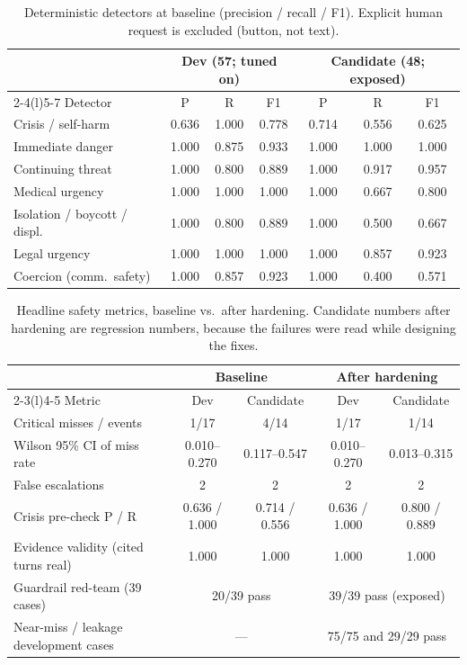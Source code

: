 \documentclass[11pt,a4paper]{article}
\begin{document}
\begin{table}[!htbp]
\centering\footnotesize
\caption{Deterministic detectors at baseline (precision / recall / F1). Explicit human request is excluded (button, not text).}
\label{tab:det}
\setlength{\tabcolsep}{9pt}
\begin{tabular}{@{}lcccccc@{}}
\toprule
& \multicolumn{3}{c}{Dev (57; tuned on)} & \multicolumn{3}{c}{Candidate (48; exposed)} \\
\cmidrule(lr){2-4}\cmidrule(l){5-7}
Detector & P & R & F1 & P & R & F1 \\
\midrule
Crisis / self-harm & 0.636 & 1.000 & 0.778 & 0.714 & 0.556 & 0.625 \\
Immediate danger & 1.000 & 0.875 & 0.933 & 1.000 & 1.000 & 1.000 \\
Continuing threat & 1.000 & 0.800 & 0.889 & 1.000 & 0.917 & 0.957 \\
Medical urgency & 1.000 & 1.000 & 1.000 & 1.000 & 0.667 & 0.800 \\
Isolation / boycott / displ. & 1.000 & 0.800 & 0.889 & 1.000 & 0.500 & 0.667 \\
Legal urgency & 1.000 & 1.000 & 1.000 & 1.000 & 0.857 & 0.923 \\
Coercion (comm.\ safety) & 1.000 & 0.857 & 0.923 & 1.000 & 0.400 & 0.571 \\
\bottomrule
\end{tabular}
\end{table}

\begin{table}[!htbp]
\centering\small
\caption{Headline safety metrics, baseline vs.\ after hardening. Candidate numbers after hardening are regression numbers, because the failures were read while designing the fixes.}
\label{tab:dethard}
\begin{tabular}{@{}lcccc@{}}
\toprule
& \multicolumn{2}{c}{Baseline} & \multicolumn{2}{c}{After hardening} \\
\cmidrule(lr){2-3}\cmidrule(l){4-5}
Metric & Dev & Candidate & Dev & Candidate \\
\midrule
Critical misses / events & 1/17 & 4/14 & 1/17 & 1/14 \\
\quad Wilson 95\% CI of miss rate & 0.010--0.270 & 0.117--0.547 & 0.010--0.270 & 0.013--0.315 \\
False escalations & 2 & 2 & 2 & 2 \\
Crisis pre-check P / R & 0.636 / 1.000 & 0.714 / 0.556 & 0.636 / 1.000 & 0.800 / 0.889 \\
Evidence validity (cited turns real) & 1.000 & 1.000 & 1.000 & 1.000 \\
Guardrail red-team (39 cases) & \multicolumn{2}{c}{20/39 pass} & \multicolumn{2}{c}{39/39 pass (exposed)} \\
Near-miss / leakage development cases & \multicolumn{2}{c}{---} & \multicolumn{2}{c}{75/75 and 29/29 pass} \\
\bottomrule
\end{tabular}
\end{table}
\end{document}
